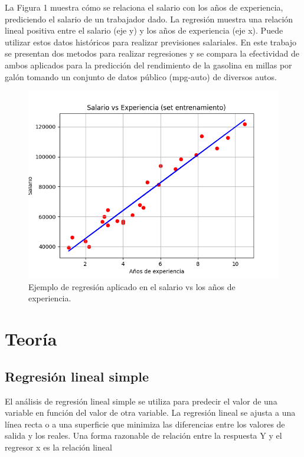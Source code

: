 \documentclass[conference]{IEEEtran}
\begin{document}
La Figura 1 muestra cómo se relaciona el salario con los años de experiencia, prediciendo el salario de un trabajador dado. La regresión muestra una relación lineal positiva entre el salario (eje y) y los años de experiencia (eje x). Puede utilizar estos datos históricos para realizar previsiones salariales. En este trabajo se presentan dos metodos para realizar regresiones y se compara la efectividad de ambos aplicados para la predicción del rendimiento de la gasolina en millas por galón tomando un conjunto de datos público (mpg-auto) de diversos autos.

\begin{figure}[h]
    \centering
    \includegraphics[scale=0.6]{1.png}
    \caption{Ejemplo de regresión aplicado en el salario vs los años de experiencia.}
    \label{fig:mesh1}
\end{figure}

\section{Teoría}
\subsection{Regresión lineal simple}
El análisis de regresión lineal simple se utiliza para predecir el valor de una variable en función del valor de otra variable. La regresión lineal se ajusta a una línea recta o a una superficie que minimiza las diferencias entre los valores de salida y los reales. Una forma razonable de relación entre la respuesta Y y el regresor x es la relación lineal
\end{document}
